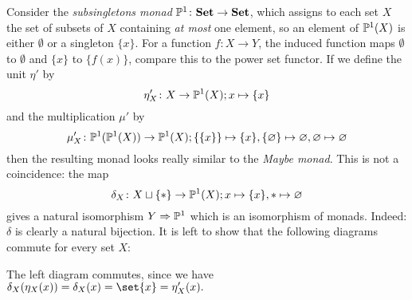 \begin{example}
    Consider the \textit{subsingletons monad} $\P^1 \colon \cat{Set} \to \cat{Set}$, which
    assigns to each set $X$ the set of subsets of $X$ containing \textit{at most} one element, so
    an element of $\P^1(X)$ is either $\emptyset$ or a singleton $\{x\}$. For a function 
    $f \colon X \to Y$, the induced function maps $\emptyset$ to $\emptyset$ and $\{x\}$ to 
    $\{f(x)\}$, compare this to the power set functor. If we define the unit $\eta'$ by
    \[
        \eta'_X \colon X \to \P^1(X); x \mapsto \{x\}
    \]
    and the multiplication $\mu'$ by 
    \[
        \mu'_X \colon \P^1(\P^1(X)) \to \P^1(X); \{\{x\}\} \mapsto \{x\},
        \{\emptyset\} \mapsto \emptyset, \emptyset \mapsto \emptyset
    \]
    then the resulting monad looks really similar to the \textit{Maybe monad}. 
    This is not a coincidence: the map
    \[
        \delta_X \colon X \sqcup \pt \to \P^1(X); x \mapsto \{x\}, \ast \mapsto \emptyset
    \]
    gives a natural isomorphism $Y \Rightarrow \P^1$ which is an isomorphism of monads.
    Indeed: $\delta$ is clearly a natural bijection. It is left to show that the following 
    diagrams commute for every set $X$:
    \begin{figure}[H]
    \centering
    \begin{subfigure}{0.4\textwidth}
    \centering
    \end{subfigure}
    \hspace{2em}
    \begin{subfigure}{0.4\textwidth}
    \centering
    \end{subfigure}
    \end{figure}
    The left diagram commutes, since we have $\delta_X(\eta_X(x))=\delta_X(x)=\set{x}=\eta'_X(x).$

\end{example}
